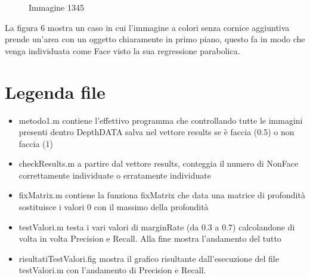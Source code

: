 \documentclass[
  italian,
]{article}
\providecommand{\tightlist}{%
  \setlength{\itemsep}{0pt}\setlength{\parskip}{0pt}}
\begin{document}
\begin{figure}
\centering
{}%
\qquad
{}%
\qquad
{}%
\caption{Immagine 1345}
\end{figure}
La figura 6 mostra un caso in cui l'immagine a colori senza cornice aggiuntiva prende un'area con un oggetto chiaramente in primo piano, questo fa in modo che venga individuata come Face visto la sua regressione parabolica.

\hypertarget{legenda-file}{%
\section{Legenda file}\label{legenda-file}}

\begin{itemize}
\tightlist
\item
  metodo1.m contiene l'effettivo programma che controllando tutte le
  immagini presenti dentro DepthDATA salva nel vettore results se è
  faccia (0.5) o non faccia (1)
\item
  checkResults.m a partire dal vettore results, conteggia il numero di
  NonFace correttamente individuate o erratamente individuate
\item
  fixMatrix.m contiene la funziona fixMatrix che data una matrice di
  profondità sostituisce i valori 0 con il massimo della profondità
\item
  testValori.m testa i vari valori di marginRate (da 0.3 a 0.7)
  calcolandone di volta in volta Precision e Recall. Alla fine mostra
  l'andamento del tutto
\item
  risultatiTestValori.fig mostra il grafico risultante dall'esecuzione
  del file testValori.m con l'andamento di Precision e Recall.
\end{itemize}
\end{document}
